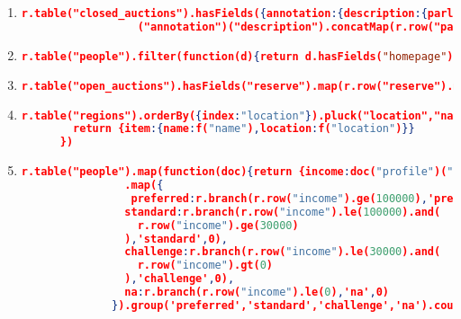 \begin{enumerate}[label=Q\arabic*.]
    \item %
	\begin{lstlisting}[language=JSON, basicstyle=\scriptsize]
	  r.table("closed_auctions").hasFields({annotation:{description:{parlist:true}}})
	              ("annotation")("description").concatMap(r.row("parlist")).hasFields({listitem:{parlist:true}})("listitem").concatMap(r.row("parlist")).hasFields({listitem:{text:{emph:{keyword:true}}}})
	\end{lstlisting}	

    
    \item %
	\begin{lstlisting}[language=JSON, basicstyle=\scriptsize]
	  r.table("people").filter(function(d){return d.hasFields("homepage").not()}).map({person:{name:r.row("name")}})
	\end{lstlisting}	

    \item %
	\begin{lstlisting}[language=JSON, basicstyle=\scriptsize]
	  r.table("open_auctions").hasFields("reserve").map(r.row("reserve").mul(2.20371))
	\end{lstlisting}	

    \item %
	\begin{lstlisting}[language=JSON, basicstyle=\scriptsize]
	  r.table("regions").orderBy({index:"location"}).pluck("location","name").map(function(f){
	    return {item:{name:f("name"),location:f("location")}}
	  })
	\end{lstlisting}
	
    \item %
	\begin{lstlisting}[language=JSON, basicstyle=\scriptsize]
	  r.table("people").map(function(doc){return {income:doc("profile")("income").default(0)}})
	            .map({
	             preferred:r.branch(r.row("income").ge(100000),'preferred',0),
	            standard:r.branch(r.row("income").le(100000).and(
	              r.row("income").ge(30000)
	            ),'standard',0),
	            challenge:r.branch(r.row("income").le(30000).and(
	              r.row("income").gt(0)
	            ),'challenge',0),
	            na:r.branch(r.row("income").le(0),'na',0)
	          }).group('preferred','standard','challenge','na').count()
	\end{lstlisting}

\end{enumerate}
